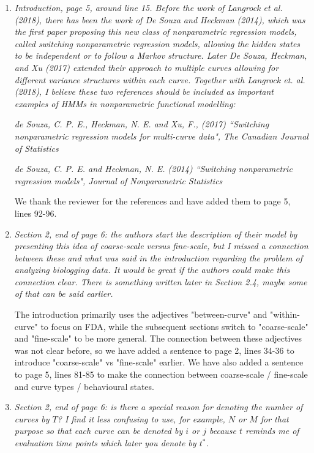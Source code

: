 \documentclass{article}
\begin{document}
\begin{enumerate}
    \item \textit{Introduction, page 5, around line 15. Before the work of Langrock et al. (2018), there has been the work of De Souza and Heckman (2014), which was the first paper proposing this new class of nonparametric regression models, called switching nonparametric regression models, allowing the hidden states to be independent or to follow a Markov structure. Later De Souza, Heckman, and Xu (2017) extended their approach to multiple curves allowing for different variance structures within each curve. Together with Langrock et. al. (2018), I believe these two references should be included as important examples of HMMs in nonparametric functional modelling:}
    
    \textit{de Souza, C. P. E., Heckman, N. E. and Xu, F., (2017) ``Switching nonparametric regression models for multi-curve data", The Canadian Journal of Statistics}

    \textit{de Souza, C. P. E. and Heckman, N. E. (2014) ``Switching nonparametric regression models", Journal of Nonparametric Statistics}
    
    We thank the reviewer for the references and have added them to page 5, lines 92-96.
    
    \item \textit{Section 2, end of page 6: the authors start the description of their model by presenting this idea of coarse-scale versus fine-scale, but I missed a connection between these and what was said in the introduction regarding the problem of analyzing biologging data. It would be great if the authors could make this connection clear. There is something written later in Section 2.4, maybe some of that can be said earlier.}
    
    The introduction primarily uses the adjectives "between-curve" and "within-curve" to focus on FDA, while the subsequent sections switch to "coarse-scale" and "fine-scale" to be more general. The connection between these adjectives was not clear before, so we have added a sentence to page 2, lines 34-36 to introduce "coarse-scale" vs "fine-scale" earlier. We have also added a sentence to page 5, lines 81-85 to make the connection between coarse-scale / fine-scale and curve types / behavioural states.
    
    \item \textit{Section 2, end of page 6: is there a special reason for denoting the number of curves by $T$? I find it less confusing to use, for example, $N$ or $M$ for that purpose so that each curve can be denoted by $i$ or $j$ because $t$ reminds me of evaluation time points which later you denote by $t^*$.}
    

\end{enumerate}
\end{document}
